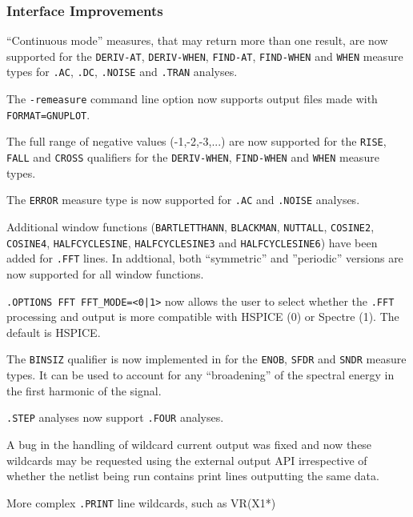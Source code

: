 \documentclass[letterpaper]{scrartcl}
\begin{document}
\subsubsection*{Interface Improvements}
\begin{XyceItemize}
  \item ``Continuous mode'' measures, that may return more than one
    result, are now supported for the \texttt{DERIV-AT},
    \texttt{DERIV-WHEN}, \texttt{FIND-AT}, \texttt{FIND-WHEN} and
    \texttt{WHEN} measure types for \texttt{.AC}, \texttt{.DC},
    \texttt{.NOISE} and \texttt{.TRAN} analyses.
  \item The \texttt{-remeasure} command line option now supports
    \Xyce{} output files made with \texttt{FORMAT=GNUPLOT}.
  \item The full range of negative values (-1,-2,-3,...) are now
    supported for the \texttt{RISE}, \texttt{FALL} and \texttt{CROSS}
    qualifiers for the \texttt{DERIV-WHEN}, \texttt{FIND-WHEN} and
    \texttt{WHEN} measure types.
  \item The \texttt{ERROR} measure type is now supported for
    \texttt{.AC} and \texttt{.NOISE} analyses.
  \item Additional window functions (\texttt{BARTLETTHANN},
    \texttt{BLACKMAN}, \texttt{NUTTALL}, \texttt{COSINE2},
    \texttt{COSINE4}, \texttt{HALFCYCLESINE}, \texttt{HALFCYCLESINE3}
    and \texttt{HALFCYCLESINE6}) have been added for \texttt{.FFT}
    lines.  In addtional, both ``symmetric'' and ''periodic'' versions
    are now supported for all window functions.
  \item \texttt{.OPTIONS FFT FFT\_MODE=<0|1>} now allows the \Xyce{}
    user to select whether the \Xyce{} \texttt{.FFT} processing and
    output is more compatible with HSPICE (0) or Spectre (1).  The
    default is HSPICE.
  \item The \texttt{BINSIZ} qualifier is now implemented in \Xyce{} for
    the \texttt{ENOB}, \texttt{SFDR} and \texttt{SNDR} measure types. It
    can be used to account for any ``broadening'' of the spectral energy
    in the first harmonic of the signal.
  \item \texttt{.STEP} analyses now support \texttt{.FOUR} analyses.
  \item A bug in the handling of wildcard current output was fixed and
    now these wildcards may be requested using the external output API
    irrespective of whether the netlist being run contains print lines
    outputting the same data.
  \item More complex \texttt{.PRINT} line wildcards, such as VR(X1*)

\end{XyceItemize}
\end{document}
